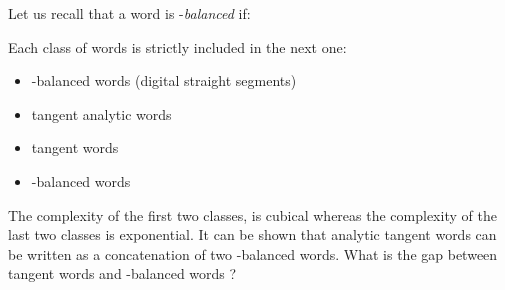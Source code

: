 \documentclass[preliminary]{eptcs}
\begin{document}
Let us recall that a word  is -\emph{balanced} if:




Each class of words is strictly included in the next one:
\begin{itemize}
\item -balanced words (digital straight segments)
\item tangent analytic words
\item tangent words
\item -balanced words \\
\end{itemize}
The complexity of the first two classes, is cubical whereas the complexity
of the last two classes is exponential.
It can be shown that analytic tangent words can be written as a
concatenation of two -balanced words. What is the gap between tangent
words and -balanced words ?




\end{document}
